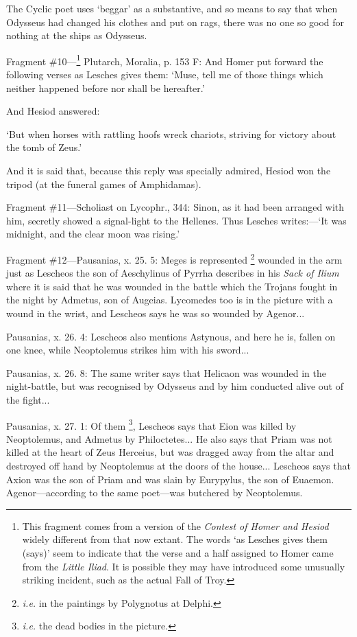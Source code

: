 The Cyclic poet uses ‘beggar’ as a substantive, and so means to say
that when Odysseus had changed his clothes and put on rags, there was no one so
good for nothing at the ships as Odysseus.

Fragment \#10—\footnote{This fragment comes from a
version of the \emph{Contest of Homer and Hesiod} widely different from
that now extant. The words ‘as Lesches gives them (says)’ seem to
indicate that the verse and a half assigned to Homer came from the
\emph{Little Iliad}. It is possible they may have introduced some
unusually striking incident, such as the actual Fall of Troy.} Plutarch, Moralia, p. 153 F: And
Homer put forward the following verses as Lesches gives them: ‘Muse, tell
me of those things which neither happened before nor shall be hereafter.’

And Hesiod answered:

‘But when horses with rattling hoofs wreck chariots, striving for victory
about the tomb of Zeus.’

And it is said that, because this reply was specially admired, Hesiod won the
tripod (at the funeral games of Amphidamas).

Fragment \#11—Scholiast on Lycophr., 344: Sinon, as it had been arranged
with him, secretly showed a signal-light to the Hellenes. Thus Lesches
writes:—‘It was midnight, and the clear moon was rising.’

Fragment \#12—Pausanias, x. 25. 5: Meges is represented \footnote{\emph{i.e.} in the
paintings by Polygnotus at Delphi.} wounded in the arm just as
Lescheos the son of Aeschylinus of Pyrrha describes in his \emph{Sack of
Ilium} where it is said that he was wounded in the battle which the
Trojans fought in the night by Admetus, son of Augeias. Lycomedes too is in the
picture with a wound in the wrist, and Lescheos says he was so wounded by
Agenor...

Pausanias, x. 26. 4: Lescheos also mentions Astynous, and here he is, fallen on
one knee, while Neoptolemus strikes him with his sword...

Pausanias, x. 26. 8: The same writer says that Helicaon was wounded in the
night-battle, but was recognised by Odysseus and by him conducted alive out of
the fight...

Pausanias, x. 27. 1: Of them \footnote{\emph{i.e.} the dead
bodies in the picture.}, Lescheos says that Eion was
killed by Neoptolemus, and Admetus by Philoctetes... He also says that Priam
was not killed at the heart of Zeus Herceius, but was dragged away from the
altar and destroyed off hand by Neoptolemus at the doors of the house...
Lescheos says that Axion was the son of Priam and was slain by Eurypylus, the
son of Euaemon. Agenor—according to the same poet—was butchered by
Neoptolemus.

